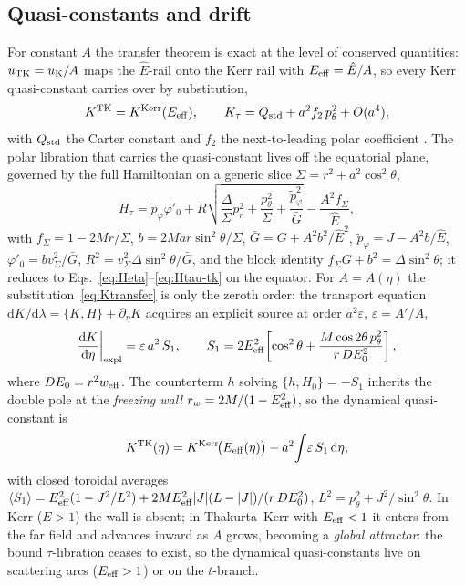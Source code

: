 \documentclass[
    aps, prd, twocolumn, superscriptaddress,
    showpacs, nofootinbib, floatfix
]{revtex4-2}
\newcommand{\Ehat}{\hat E}
\newcommand{\dd}{\mathrm{d}}
\begin{document}
\subsection{Quasi-constants and drift}
\label{sec:quasiconst}
For constant $A$ the transfer theorem is exact at the level of conserved
quantities: $u_{\rm TK}=u_{\rm K}/A$ maps the $\Ehat$-rail onto the Kerr rail with
$E_{\rm eff}=\Ehat/A$, so every Kerr quasi-constant carries over by substitution,
\begin{equation}
    K^{\rm TK}=K^{\rm Kerr}(E_{\rm eff}),\qquad
    K_\tau=Q_{\rm std}+a^2 f_2\,p_\theta^2+O(a^4),
    \label{eq:Ktransfer}
\end{equation}
with $Q_{\rm std}$ the Carter constant and $f_2$ the next-to-leading polar
coefficient \cite{Carter1968,RosignoliKerr}. The polar libration that carries the
quasi-constant lives off the equatorial plane, governed by the full Hamiltonian
on a generic slice $\Sigma=r^2+a^2\cos^2\theta$,
\begin{equation}
    H_\tau=\tilde p_\varphi\varphi'_0
      +R\sqrt{\frac{\Delta}{\Sigma}p_r^2+\frac{p_\theta^2}{\Sigma}
      +\frac{\tilde p_\varphi^2}{\bar G}}-\frac{A^2 f_\Sigma}{\Ehat},
    \label{eq:H3d}
\end{equation}
with $f_\Sigma=1-2Mr/\Sigma$, $b=2Mar\sin^2\theta/\Sigma$,
$\bar G=G+A^2 b^2/\Ehat^2$, $\tilde p_\varphi=J-A^2 b/\Ehat$,
$\varphi'_0=b\bar v_\Sigma^2/\bar G$, $R^2=\bar v_\Sigma^2\Delta\sin^2\theta/\bar G$,
and the block identity $f_\Sigma G+b^2=\Delta\sin^2\theta$; it reduces to
Eqs.~\eqref{eq:Heta}--\eqref{eq:Htau-tk} on the equator. For $A=A(\eta)$ the
substitution~\eqref{eq:Ktransfer} is only the zeroth order: the transport equation
$\dd K/\dd\lambda=\{K,H\}+\partial_\eta K$ acquires an explicit source at order
$a^2\varepsilon$, $\varepsilon=A'/A$,
\begin{equation}
    \frac{\dd K}{\dd\eta}\bigg|_{\rm expl}=\varepsilon\,a^2\,S_1,\qquad
    S_1=2E_{\rm eff}^2\!\left[\cos^2\theta
        +\frac{M\cos2\theta\,p_\theta^2}{r\,DE_0^2}\right],
    \label{eq:S1}
\end{equation}
where $DE_0=r^2 w_{\rm eff}$. The counterterm $h$ solving $\{h,H_0\}=-S_1$
inherits the double pole at the \emph{freezing wall}
$r_w=2M/(1-E_{\rm eff}^2)$, so the dynamical quasi-constant is
\begin{equation}
    K^{\rm TK}(\eta)=K^{\rm Kerr}\!\big(E_{\rm eff}(\eta)\big)
        -a^2\!\int\!\varepsilon\,S_1\,\dd\eta,
    \label{eq:Kdyn}
\end{equation}
with closed toroidal averages
$\langle S_1\rangle=E_{\rm eff}^2(1-J^2/L^2)
+2ME_{\rm eff}^2|J|(L-|J|)/(r\,DE_0^2)$, $L^2=p_\theta^2+J^2/\sin^2\theta$. In
Kerr ($E>1$) the wall is absent; in Thakurta--Kerr with $E_{\rm eff}<1$ it enters
from the far field and advances inward as $A$ grows, becoming a \emph{global
attractor}: the bound $\tau$-libration ceases to exist, so the dynamical
quasi-constants live on scattering arcs ($E_{\rm eff}>1$) or on the $t$-branch.
\end{document}
